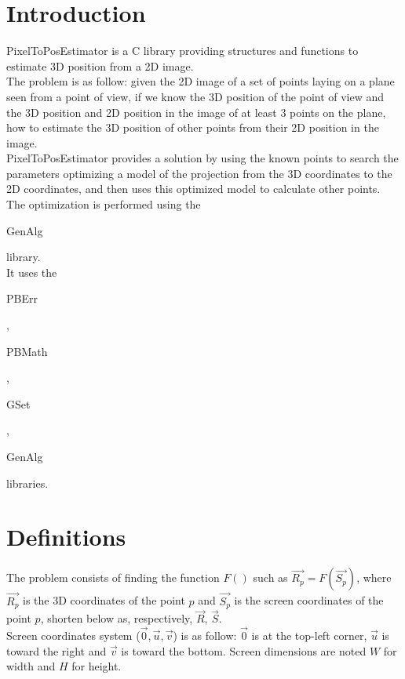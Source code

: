 \section*{Introduction}

PixelToPosEstimator is a C library providing structures and functions to estimate 3D position from a 2D image.\\ 

The problem is as follow: given the 2D image of a set of points laying on a plane seen from a point of view, if we know the 3D position of the point of view and the 3D position and 2D position in the image of at least 3 points on the plane, how to estimate the 3D position of other points from their 2D position in the image.\\

PixelToPosEstimator provides a solution by using the known points to search the parameters optimizing a model of the projection from the 3D coordinates to the 2D coordinates, and then uses this optimized model to calculate other points. The optimization is performed using the \begin{ttfamily}GenAlg\end{ttfamily} library.\\

It uses the \begin{ttfamily}PBErr\end{ttfamily}, \begin{ttfamily}PBMath\end{ttfamily}, \begin{ttfamily}GSet\end{ttfamily}, \begin{ttfamily}GenAlg\end{ttfamily} libraries.\\

\section{Definitions}

The problem consists of finding the function $F()$ such as $\overrightarrow{R_p}=F(\overrightarrow{S_p})$, where $\overrightarrow{R_p}$ is the 3D coordinates of the point $p$ and $\overrightarrow{S_p}$ is the screen coordinates of the point $p$, shorten below as, respectively, $\overrightarrow{R}$, $\overrightarrow{S}$.\\

Screen coordinates system ($\overrightarrow{0},\overrightarrow{u},\overrightarrow{v}$) is as follow: $\overrightarrow{0}$ is at the top-left corner, $\overrightarrow{u}$ is toward the right and $\overrightarrow{v}$ is toward the bottom. Screen dimensions are noted $W$ for width and $H$ for height.\\

